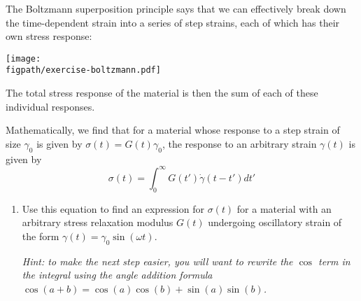 \begin{activity}
\begin{exercises}
			The Boltzmann superposition principle says that we can effectively break down the time-dependent strain into a series of step strains, each of which has their own stress response:
				
		\centerline{\texttt{[image: \\figpath/exercise-boltzmann.pdf]}}
			
			The total stress response of the material is then the sum of each of these individual responses.
			
			Mathematically, we find that for a material whose response to a step strain of size $\gamma_0$ is given by $\sigma(t) = G(t)\gamma_0$, the response to an arbitrary strain $\gamma(t)$ is given by
			\begin{equation*}
				\sigma(t) = \int_0^{\infty} G(t') \dot\gamma(t-t') dt'
			\end{equation*}
		
			\begin{enumerate}
			
				\item Use this equation to find an expression for $\sigma(t)$ for a material with an arbitrary stress relaxation modulus $G(t)$ undergoing oscillatory strain of the form $\gamma(t) = \gamma_0 \sin(\omega t)$.
				
					\emph{Hint: to make the next step easier, you will want to rewrite the $\cos$ term in the integral using the angle addition formula $\cos(a+b) = \cos(a)\cos(b) + \sin(a)\sin(b)$.}
				
					\begin{solution}
\end{solution}
\end{enumerate}
\end{exercises}
\end{activity}
